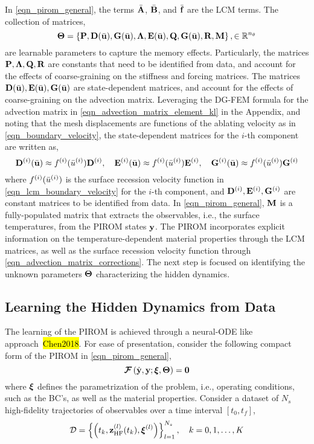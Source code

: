 In \cref{eqn_pirom_general}, the terms $\bar{\mathbf{A}}$, $\bar{\mathbf{B}}$, and $\bar{\mathbf{f}}$ are the LCM terms. The collection of matrices,
\begin{equation}
    \boldsymbol{\Theta} = \left\{\mathbf{P},\mathbf{D}(\bar{\mathbf{u}}),\mathbf{G}(\bar{\mathbf{u}}),\boldsymbol{\Lambda},\mathbf{E}(\bar{\mathbf{u}}),\mathbf{Q},\mathbf{G}(\bar{\mathbf{u}}),\mathbf{R},\mathbf{M}\right\},\in\mathbb{R}^{n_{\theta}}
\end{equation}
are learnable parameters to capture the memory effects. Particularly, the matrices $\mathbf{P},\boldsymbol{\Lambda},\mathbf{Q},\mathbf{R}$ are constants that need to be identified from data, and account for the effects of coarse-graining on the stiffness and forcing matrices. The matrices $\mathbf{D}(\bar{\mathbf{u}}),\mathbf{E}(\bar{\mathbf{u}}),\mathbf{G}(\bar{\mathbf{u}})$ are state-dependent matrices, and account for the effects of coarse-graining on the advection matrix. Leveraging the DG-FEM formula for the advection matrix in \cref{eqn_advection_matrix_element_kl} in the Appendix, and noting that the mesh displacements are functions of the ablating velocity as in \cref{eqn_boundary_velocity}, the state-dependent matrices for the $i$-th component are written as,
\begin{equation}
    \mathbf{D}^{(i)}(\bar{\mathbf{u}}) \approx f^{(i)}(\bar{u}^{(i)})\mathbf{D}^{(i)}, \quad \mathbf{E}^{(i)}(\bar{\mathbf{u}}) \approx f^{(i)}(\bar{u}^{(i)})\mathbf{E}^{(i)}, \quad \mathbf{G}^{(i)}(\bar{\mathbf{u}}) \approx f^{(i)}(\bar{u}^{(i)})\mathbf{G}^{(i)}\label{eqn_advection_matrix_corrections}
\end{equation}
where $f^{(i)}(\bar{u}^{(i)})$ is the surface recession velocity function in \cref{eqn_lcm_boundary_velocity} for the $i$-th component, and $\mathbf{D}^{(i)},\mathbf{E}^{(i)},\mathbf{G}^{(i)}$ are constant matrices to be identified from data. In \cref{eqn_pirom_general}, $\mathbf{M}$ is a fully-populated matrix that extracts the observables, i.e., the surface temperatures, from the PIROM states $\mathbf{y}$. The PIROM incorporates explicit information on the temperature-dependent material properties through the LCM matrices, as well as the surface recession velocity function through \cref{eqn_advection_matrix_corrections}. The next step is focused on identifying the unknown parameters $\boldsymbol{\Theta}$ characterizing the hidden dynamics.

\subsection{Learning the Hidden Dynamics from Data}

The learning of the PIROM is achieved through a neural-ODE like approach~\hl{Chen2018}. For ease of presentation, consider the following compact form of the PIROM in \cref{eqn_pirom_general},
\begin{equation}
    \boldsymbol{\mathcal{F}}\left(\dot{\mathbf{y}},\mathbf{y};\boldsymbol{\xi},\boldsymbol{\Theta}\right) = \boldsymbol{0}\label{eqn_pirom_compact}
\end{equation}
where $\boldsymbol{\xi}$ defines the parametrization of the problem, i.e., operating conditions, such as the BC's, as well as the material properties. Consider a dataset of $N_s$ high-fidelity trajectories of observables over a time interval $[t_0,t_f]$,
\begin{equation}
    \mathcal{D} = \left\{\left(t_k,\mathbf{z}^{(l)}_{\text{HF}}(t_k),\boldsymbol{\xi}^{(l)}\right)\right\}_{l=1}^{N_s},\quad k=0,1,\dots,K
\end{equation}

